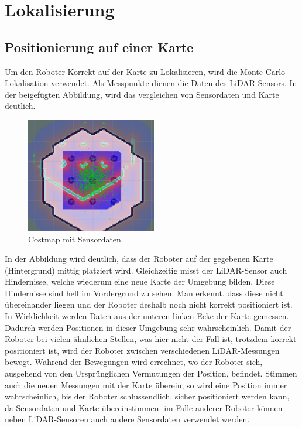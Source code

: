 \section{Lokalisierung}
{	
	\subsection{Positionierung auf einer Karte}
	{
		
	Um den Roboter Korrekt auf der Karte zu Lokalisieren, wird die Monte-Carlo-Lokalisation verwendet. Als Messpunkte dienen die Daten des LiDAR-Sensors. In der beigefügten Abbildung, wird das vergleichen von Sensordaten und Karte deutlich.
		\begin{figure}[H]
			\centering
			\includegraphics[height=5cm]{Bilder/costmap_monte_carlo_example.png}
			\caption{Costmap mit Sensordaten} 
			\label{pic:coastmontecarlo}
		\end{figure}
		In der Abbildung wird deutlich, dass der Roboter auf der gegebenen Karte (Hintergrund) mittig platziert wird. Gleichzeitig misst der LiDAR-Sensor auch Hindernisse, welche wiederum eine neue Karte der Umgebung bilden. Diese Hindernisse sind hell im Vordergrund zu sehen. Man erkennt, dass diese nicht übereinander liegen und der Roboter deshalb noch nicht korrekt positioniert ist. In Wirklichkeit werden Daten aus der unteren linken Ecke der Karte gemessen. Dadurch werden Positionen in dieser Umgebung sehr wahrscheinlich. Damit der Roboter bei vielen ähnlichen Stellen, was hier nicht der Fall ist, trotzdem korrekt positioniert ist, wird der Roboter zwischen verschiedenen LiDAR-Messungen bewegt. Während der Bewegungen wird errechnet, wo der Roboter sich, ausgehend von den Ursprünglichen Vermutungen der Position, befindet. Stimmen auch die neuen Messungen mit der Karte überein, so wird eine Position immer wahrscheinlich, bis der Roboter schlussendlich, sicher positioniert werden kann, da Sensordaten und Karte übereinstimmen. im Falle anderer Roboter können neben LiDAR-Sensoren auch andere Sensordaten verwendet werden.
	}
}